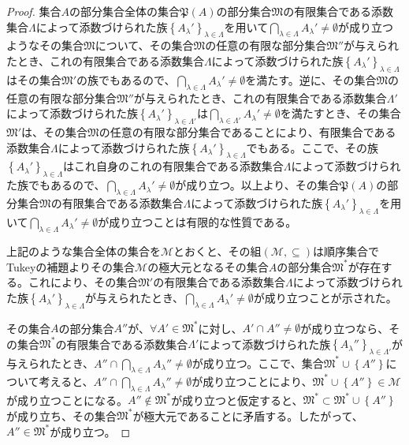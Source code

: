 \documentclass[dvipdfmx]{jsarticle}
\begin{document}
\begin{proof}
集合$A$の部分集合全体の集合$\mathfrak{P}(A)$の部分集合$\mathfrak{M}$の有限集合である添数集合$\varLambda $によって添数づけられた族$\left\{ A_{\lambda}' \right\}_{\lambda \in \varLambda }$を用いて$\bigcap_{\lambda \in \varLambda } A_{\lambda}' \neq \emptyset$が成り立つようなその集合$\mathfrak{M}$について、その集合$\mathfrak{M}$の任意の有限な部分集合$\mathfrak{M}''$が与えられたとき、これの有限集合である添数集合$\varLambda $によって添数づけられた族$\left\{ A_{\lambda}' \right\}_{\lambda \in \varLambda }$はその集合$\mathfrak{M}'$の族でもあるので、$\bigcap_{\lambda \in \varLambda } A_{\lambda}' \neq \emptyset$を満たす。逆に、その集合$\mathfrak{M}$の任意の有限な部分集合$\mathfrak{M}''$が与えられたとき、これの有限集合である添数集合$\varLambda '$によって添数づけられた族$\left\{ A_{\lambda}' \right\}_{\lambda \in \varLambda '}$は$\bigcap_{\lambda \in \varLambda '} A_{\lambda}' \neq \emptyset$を満たすとき、その集合$\mathfrak{M}'$は、その集合$\mathfrak{M}$の任意の有限な部分集合であることにより、有限集合である添数集合$\varLambda $によって添数づけられた族$\left\{ A_{\lambda}' \right\}_{\lambda \in \varLambda }$でもある。ここで、その族$\left\{ A_{\lambda}' \right\}_{\lambda \in \varLambda }$はこれ自身のこれの有限集合である添数集合$\varLambda $によって添数づけられた族でもあるので、$\bigcap_{\lambda \in \varLambda } A_{\lambda}' \neq \emptyset$が成り立つ。以上より、その集合$\mathfrak{P}(A)$の部分集合$\mathfrak{M}$の有限集合である添数集合$\varLambda $によって添数づけられた族$\left\{ A_{\lambda}' \right\}_{\lambda \in \varLambda }$を用いて$\bigcap_{\lambda \in \varLambda } A_{\lambda}' \neq \emptyset$が成り立つことは有限的な性質である。\par
上記のような集合全体の集合を$\mathcal{M}$とおくと、その組$\left( \mathcal{M, \subseteq} \right)$は順序集合でTukeyの補題よりその集合$\mathcal{M}$の極大元となるその集合$A$の部分集合$\mathfrak{M}^{*}$が存在する。これにより、その集合$\mathfrak{M}'$の有限集合である添数集合$\varLambda $によって添数づけられた族$\left\{ A_{\lambda}' \right\}_{\lambda \in \varLambda }$が与えられたとき、$\bigcap_{\lambda \in \varLambda } A_{\lambda}' \neq \emptyset$が成り立つことが示された。\par
その集合$A$の部分集合$A''$が、$\forall A' \in \mathfrak{M}^{*}$に対し、$A' \cap A'' \neq \emptyset$が成り立つなら、その集合$\mathfrak{M}^{*}$の有限集合である添数集合$\varLambda '$によって添数づけられた族$\left\{ A_{\lambda}'' \right\}_{\lambda \in \varLambda '}$が与えられたとき、$A'' \cap \bigcap_{\lambda \in \varLambda } A_{\lambda}'' \neq \emptyset$が成り立つ。ここで、集合$\mathfrak{M}^{*} \cup \left\{ A'' \right\}$について考えると、$A'' \cap \bigcap_{\lambda \in \varLambda } A_{\lambda}'' \neq \emptyset$が成り立つことにより、$\mathfrak{M}^{*} \cup \left\{ A'' \right\}\in \mathcal{M}$が成り立つことになる。$A'' \notin \mathfrak{M}^{*}$が成り立つと仮定すると、$\mathfrak{M}^{*} \subset \mathfrak{M}^{*} \cup \left\{ A'' \right\}$が成り立ち、その集合$\mathfrak{M}^{*}$が極大元であることに矛盾する。したがって、$A'' \in \mathfrak{M}^{*}$が成り立つ。
\end{proof}
\end{document}
